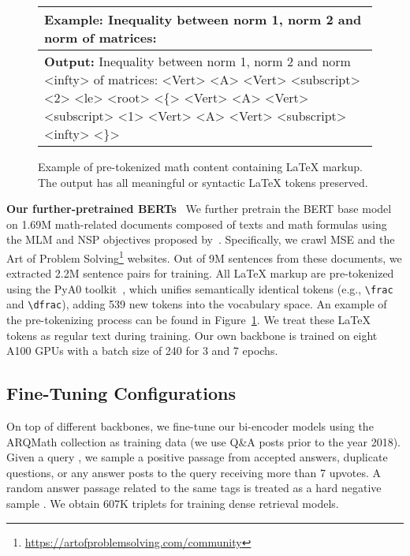 \documentclass[11pt]{article}
\begin{document}
\begin{figure}
\small
\centering
\renewcommand{\arraystretch}{1.5}
\begin{tabular}{p{2.9in}}
\toprule
\textbf{Example: } Inequality between norm 1, norm 2 and norm  of matrices:

\\ \midrule
\textbf{Output: } Inequality between norm 1, norm 2 and norm <infty> of matrices: <Vert> <A> <Vert> <subscript> <2> <le> <root> <\{> <Vert> <A> <Vert> <subscript> <1> <Vert> <A> <Vert> <subscript> <infty> <\}>
\\ \bottomrule
\end{tabular}
\caption{\label{fig:pretokenize}
Example of pre-tokenized math content containing \LaTeX{} markup.
The output has all meaningful or syntactic \LaTeX{} tokens preserved.}
\end{figure}

\smallskip \noindent
\textbf{Our further-pretrained BERTs} \ 
We further pretrain the BERT base model on 1.69M math-related documents composed of texts and math formulas using the MLM and NSP objectives proposed by~\citet{devlin2019bert}.
Specifically, we crawl MSE and the Art of Problem Solving\footnote{\url{https://artofproblemsolving.com/community}} websites.
Out of 9M sentences from these documents, we extracted 2.2M sentence pairs for training.
All \LaTeX{} markup are pre-tokenized using the PyA0 toolkit~\cite{zhong2021pya0}, which unifies semantically identical tokens (e.g., \texttt{\textbackslash frac} and \texttt{\textbackslash dfrac}), adding 539 new tokens into the vocabulary space.
An example of the pre-tokenizing process can be found in Figure~\ref{fig:pretokenize}.
We treat these \LaTeX{} tokens as regular text during training.
Our own backbone is trained on eight A100 GPUs with a batch size of 240 for 3 and 7 epochs.

\subsection{Fine-Tuning Configurations}

On top of different backbones, we fine-tune our bi-encoder models using the ARQMath collection as training data (we use Q\&A posts prior to the year 2018).
Given a query , we sample a positive passage  from accepted answers, duplicate questions, or any answer posts to the query receiving more than 7 upvotes.
A random answer passage related to the same tags is treated as a hard negative sample .
We obtain 607K  triplets for training dense retrieval models.
\end{document}
